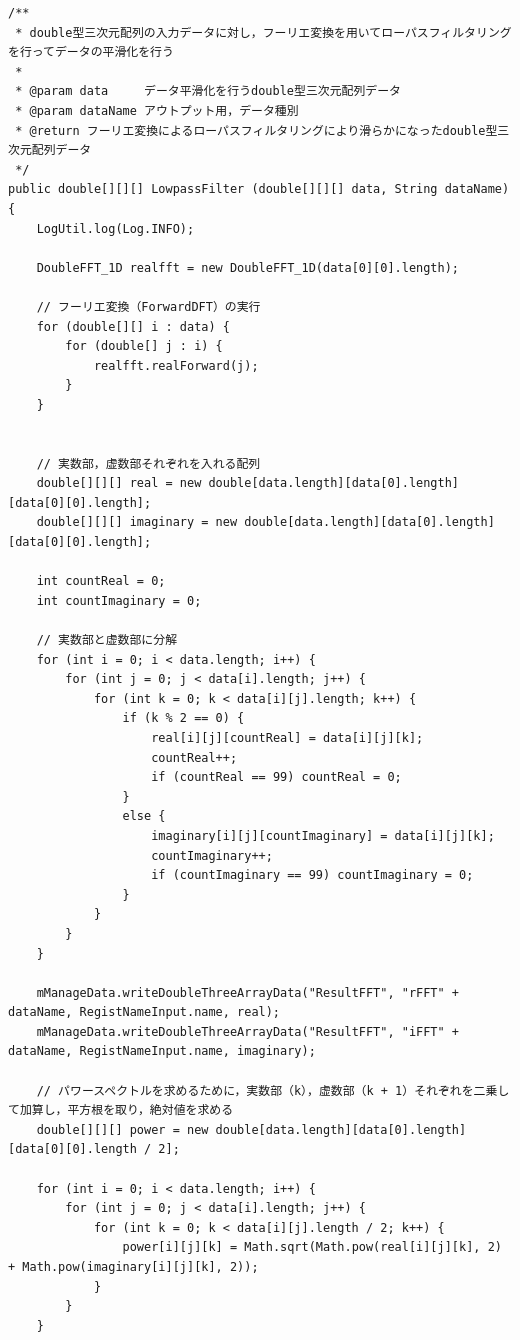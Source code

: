 \documentclass[11pt]{jreport}
\begin{document}
        \begin{lstlisting}[caption=ローパスフィルタ処理, label=lowpass]
/**
 * double型三次元配列の入力データに対し，フーリエ変換を用いてローパスフィルタリングを行ってデータの平滑化を行う
 *
 * @param data     データ平滑化を行うdouble型三次元配列データ
 * @param dataName アウトプット用，データ種別
 * @return フーリエ変換によるローパスフィルタリングにより滑らかになったdouble型三次元配列データ
 */
public double[][][] LowpassFilter (double[][][] data, String dataName) {
    LogUtil.log(Log.INFO);

    DoubleFFT_1D realfft = new DoubleFFT_1D(data[0][0].length);

    // フーリエ変換（ForwardDFT）の実行
    for (double[][] i : data) {
        for (double[] j : i) {
            realfft.realForward(j);
        }
    }


    // 実数部，虚数部それぞれを入れる配列
    double[][][] real = new double[data.length][data[0].length][data[0][0].length];
    double[][][] imaginary = new double[data.length][data[0].length][data[0][0].length];

    int countReal = 0;
    int countImaginary = 0;

    // 実数部と虚数部に分解
    for (int i = 0; i < data.length; i++) {
        for (int j = 0; j < data[i].length; j++) {
            for (int k = 0; k < data[i][j].length; k++) {
                if (k % 2 == 0) {
                    real[i][j][countReal] = data[i][j][k];
                    countReal++;
                    if (countReal == 99) countReal = 0;
                }
                else {
                    imaginary[i][j][countImaginary] = data[i][j][k];
                    countImaginary++;
                    if (countImaginary == 99) countImaginary = 0;
                }
            }
        }
    }

    mManageData.writeDoubleThreeArrayData("ResultFFT", "rFFT" + dataName, RegistNameInput.name, real);
    mManageData.writeDoubleThreeArrayData("ResultFFT", "iFFT" + dataName, RegistNameInput.name, imaginary);

    // パワースペクトルを求めるために，実数部（k），虚数部（k + 1）それぞれを二乗して加算し，平方根を取り，絶対値を求める
    double[][][] power = new double[data.length][data[0].length][data[0][0].length / 2];

    for (int i = 0; i < data.length; i++) {
        for (int j = 0; j < data[i].length; j++) {
            for (int k = 0; k < data[i][j].length / 2; k++) {
                power[i][j][k] = Math.sqrt(Math.pow(real[i][j][k], 2) + Math.pow(imaginary[i][j][k], 2));
            }
        }
    }


\end{lstlisting}
\end{document}
